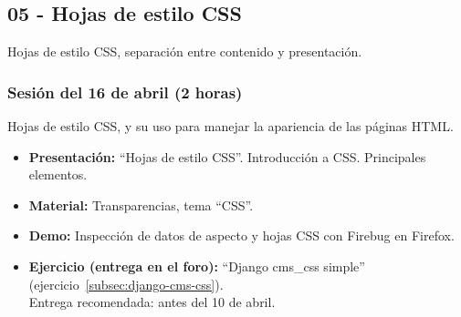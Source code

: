 \documentclass[a4paper,12pt]{article}
\begin{document}

%
%
%
%
\subsection{05 - Hojas de estilo CSS}

Hojas de estilo CSS, separación entre contenido y presentación.

\subsubsection{Sesión del 16 de abril (2 horas)}

Hojas de estilo CSS, y su uso para manejar la apariencia de las páginas HTML.

\begin{itemize}
\item \textbf{Presentación:} ``Hojas de estilo CSS''. Introducción a CSS. Principales elementos.
 \item \textbf{Material:} Transparencias, tema ``CSS''.
\item \textbf{Demo:} Inspección de datos de aspecto y hojas CSS con Firebug en Firefox.
\item \textbf{Ejercicio (entrega en el foro):} ``Django cms\_css simple'' (ejercicio~\ref{subsec:django-cms-css}). \\
Entrega recomendada: antes del 10 de abril.
\end{itemize}
\end{document}
